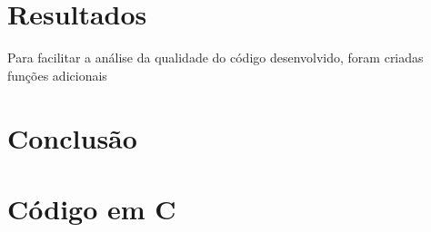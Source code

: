 \documentclass[final,3p,12pt]{elsarticle}
\begin{document}
    
    \section{Resultados}
    
    Para facilitar a análise da qualidade do código desenvolvido, foram criadas funções adicionais 
    
    \section{Conclusão}
    
    \label{}
    



 







\appendix

\section{Código em C}


\end{document}
